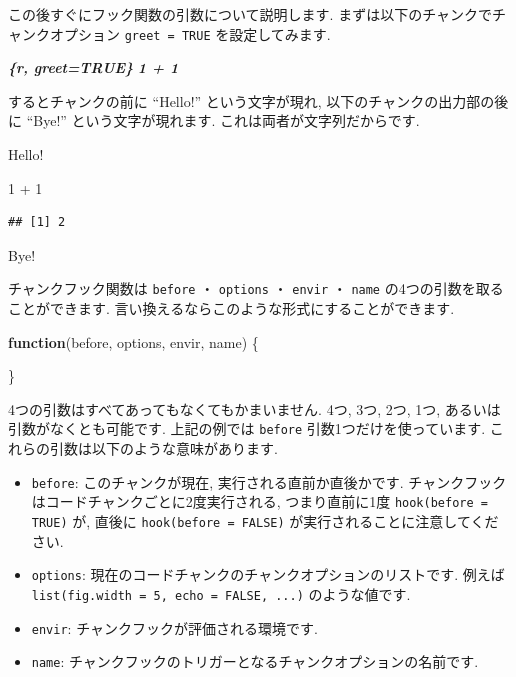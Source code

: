 \documentclass[
  11pt,
  lualatex,
  ja=standard]{bxjsreport}
\newenvironment{Shaded}{\begin{snugshade}}{\end{snugshade}}
\newcommand{\ControlFlowTok}[1]{\textcolor[rgb]{0.13,0.29,0.53}{\textbf{#1}}}
\newcommand{\DecValTok}[1]{\textcolor[rgb]{0.00,0.00,0.81}{#1}}
\newcommand{\InformationTok}[1]{\textcolor[rgb]{0.56,0.35,0.01}{\textbf{\textit{#1}}}}
\newcommand{\NormalTok}[1]{#1}
\newcommand{\SpecialCharTok}[1]{\textcolor[rgb]{0.00,0.00,0.00}{#1}}
\renewenvironment{quote}{\def\FrameCommand{{\color{quotebarcolor}{\vrule width 3pt}}\hspace{10pt}}\MakeFramed{\advance\hsize-\width\FrameRestore}}{\endMakeFramed}
\begin{document}
この後すぐにフック関数の引数について説明します. まずは以下のチャンクでチャンクオプション \texttt{greet = TRUE} を設定してみます.

\begin{Shaded}
\begin{Highlighting}[]
\InformationTok{\textasciigrave{}\textasciigrave{}\textasciigrave{}\{r, greet=TRUE\}}
\InformationTok{1 + 1}
\InformationTok{\textasciigrave{}\textasciigrave{}\textasciigrave{}}
\end{Highlighting}
\end{Shaded}

するとチャンクの前に ``Hello!'' という文字が現れ, 以下のチャンクの出力部の後に ``Bye!'' という文字が現れます. これは両者が文字列だからです.

\begin{quote}
Hello!

\begin{Shaded}
\begin{Highlighting}[numbers=left,,]
\DecValTok{1} \SpecialCharTok{+} \DecValTok{1}
\end{Highlighting}
\end{Shaded}

\begin{verbatim}
## [1] 2
\end{verbatim}

Bye!
\end{quote}

チャンクフック関数は \texttt{before} ・ \texttt{options} ・ \texttt{envir} ・ \texttt{name} の4つの引数を取ることができます. 言い換えるならこのような形式にすることができます.

\begin{Shaded}
\begin{Highlighting}[]
\ControlFlowTok{function}\NormalTok{(before, options, envir, name) \{}

\NormalTok{\}}
\end{Highlighting}
\end{Shaded}

4つの引数はすべてあってもなくてもかまいません. 4つ, 3つ, 2つ, 1つ, あるいは引数がなくとも可能です. 上記の例では \texttt{before} 引数1つだけを使っています. これらの引数は以下のような意味があります.

\begin{itemize}
\item
  \texttt{before}: このチャンクが現在, 実行される直前か直後かです. チャンクフックはコードチャンクごとに2度実行される, つまり直前に1度 \texttt{hook(before = TRUE)} が, 直後に \texttt{hook(before = FALSE)} が実行されることに注意してください.
\item
  \texttt{options}: 現在のコードチャンクのチャンクオプションのリストです. 例えば \texttt{list(fig.width = 5, echo = FALSE, ...)} のような値です.
\item
  \texttt{envir}: チャンクフックが評価される環境です.
\item
  \texttt{name}: チャンクフックのトリガーとなるチャンクオプションの名前です.
\end{itemize}
\end{document}

